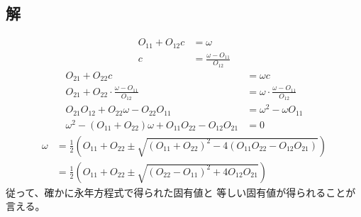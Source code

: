 \subsection{解}
\begin{align}
	O_{11}
	+
	O_{12} c
&=
	\omega \\
%
%
	c
&=
	\frac{\omega-O_{11}}{O_{12}}
\end{align}
\begin{align}
	O_{21}
	+
	O_{22} c
&=
	\omega c \\
%
%
	O_{21}
	+
	O_{22} \cdot \frac{\omega-O_{11}}{O_{12}}
&=
	\omega \cdot \frac{\omega-O_{11}}{O_{12}} \\
%
%
	O_{21} O_{12}
	+
	O_{22} \omega
	-
	O_{22} O_{11}
&=
	\omega^2
	-
	\omega O_{11} \\
%
%
	\omega^2
	-
	(O_{11}+O_{22}) \omega
	+
	O_{11} O_{22}
	-
	O_{12} O_{21}
&=
	0
\end{align}
\begin{align}
	\omega
&=
	\frac{1}{2}
		\left(
			O_{11}
			+
			O_{22}
			\pm
			\sqrt{
				(O_{11}+O_{22})^2
				-
				4 (O_{11}O_{22}-O_{12}O_{21})
			}
		\right) \\
%
%
&=
	\frac{1}{2}
		\left(
			O_{11}
			+
			O_{22}
			\pm
			\sqrt{
				(O_{22}-O_{11})^2
				+
				4 O_{12} O_{21}
			}
		\right)
\end{align}
従って、確かに永年方程式で得られた固有値と
等しい固有値が得られることが言える。





